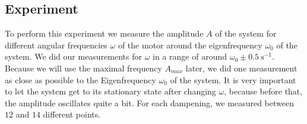 \subsection{Experiment}
To perform this experiment we measure the amplitude $A$ of the system for different angular frequencies $\omega$ of the motor around the eigenfrequency $\omega_0$ of the system.
We did our measurements for $\omega$ in a range of around $\omega_0 \pm \SI{0.5}{\second^{-1}}$.
Because we will use the maximal frequency $A_{max}$ later, we did one measurement as close as possible to the Eigenfrequency $\omega_0$ of the system.
It is very important to let the system get to its stationary state after changing $\omega$, because before that, the amplitude oscillates quite a bit.
For each dampening, we measured between $12$ and $14$ different points.
